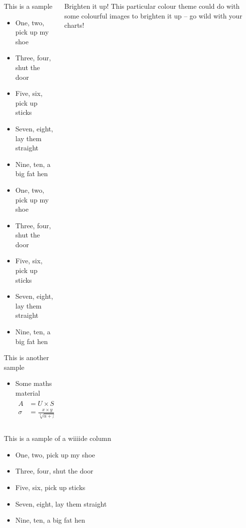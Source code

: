\documentclass{beamer}
\begin{document}
\begin{frame}[fragile]
\begin{columns}[T]
\begin{column}{.3\textwidth}
\begin{block}{This is a sample}
\begin{itemize}
\item One, two, pick up my shoe
\item Three, four, shut the door
\item Five, six, pick up sticks
\item Seven, eight, lay them straight
\item Nine, ten, a big fat hen
\item One, two, pick up my shoe
\item Three, four, shut the door
\item Five, six, pick up sticks
\item Seven, eight, lay them straight
\item Nine, ten, a big fat hen
\end{itemize}
\end{block}


\begin{block}{This is another sample}
\begin{itemize}
\item Some maths material
\begin{align}
A &= U \times S \times V^T\\
\sigma &= \frac{x\times y}{\sqrt[3]{\alpha + \beta}}
\end{align}
\end{itemize}
\end{block}
\end{column}

\begin{column}{.33\textwidth}
\begin{block}{Brighten it up!}
This particular colour theme could do with some colourful images to brighten it up -- go wild with your charts!

\end{block}
\end{column}

\end{columns}

\begin{block}{This is a sample of a wiiiide column}
\begin{itemize}
\item One, two, pick up my shoe
\item Three, four, shut the door
\item Five, six, pick up sticks
\item Seven, eight, lay them straight
\item Nine, ten, a big fat hen
\end{itemize}
\end{block}


\end{frame}
\end{document}
